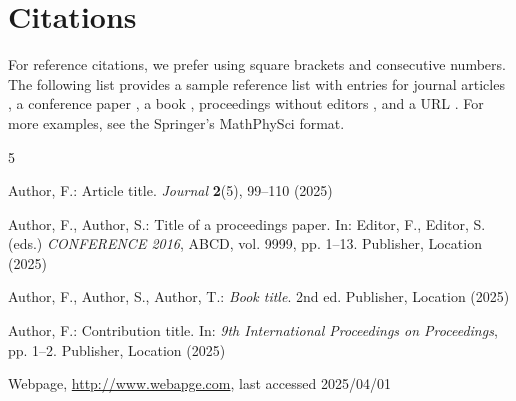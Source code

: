 \documentclass{iLRNConfProc}
\begin{document}
\section*{Citations}
For reference citations, we prefer using square brackets and consecutive numbers. The following list provides a sample reference list with entries for journal articles \cite{ref1}, a conference paper \cite{ref2}, a book \cite{ref3}, proceedings without editors \cite{ref4}, and a URL \cite{ref5}. For more examples, see the Springer’s MathPhySci format.



\begin{thebibliography}{5}  %

Author, F.: Article title. \textit{Journal} \textbf{2}(5), 99--110 (2025)

Author, F., Author, S.: Title of a proceedings paper. In: Editor, F., Editor, S. (eds.) \textit{CONFERENCE 2016}, ABCD, vol. 9999, pp. 1--13. Publisher, Location (2025)

Author, F., Author, S., Author, T.: \textit{Book title}. 2nd ed. Publisher, Location (2025)

Author, F.: Contribution title. In: \textit{9th International Proceedings on Proceedings}, pp. 1--2. Publisher, Location (2025)

Webpage, \url{http://www.webapge.com}, last accessed 2025/04/01

\end{thebibliography}
\end{document}
